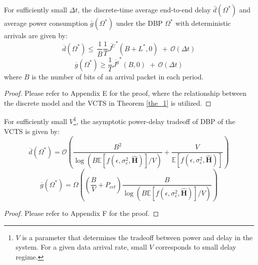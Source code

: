 \documentclass[11pt,journal, onecolumn]{./IEEEtran}
\newcommand{\blue}{\color{black}}
\newcommand{\red}{\color{black}}
\begin{document}
\begin{Theorem}\label{the_dpbound} {\red For sufficiently small $\Delta t$,} the discrete-time average end-to-end delay $\bar d(\Omega^*)$ and average power consumption $\bar g(\Omega^*)$ under the DBP $\Omega^*$ with deterministic arrivals are given by:
\begin{equation}\label{eq_dup}
\overline d \left( {{\Omega ^*}} \right) \le \,\frac{1}{{\overline B }}\frac{1}{T}{\overline {{J^U}} ^*}(B + {L^*},0)\,\, + \,\mathcal O\left( {\Delta t} \right)
\end{equation}
\begin{equation}\label{eq_plow}
\overline g \left( {{\Omega ^*}} \right) \ge \frac{1}{T}{\overline {{J^g}} ^*}(B ,0)\,\, + \,\mathcal O\left({\Delta t} \right)
\end{equation}
where $B$ is the number of bits of an arrival packet in each period. ~\hfill\IEEEQED
\end{Theorem}
\begin{proof}
Please refer to Appendix E for the proof, {\red where the relationship between the discrete model and the VCTS in Theorem \ref{the_1} is utilized.}
\end{proof}
\begin{Corollary}\label{cor_order} {\red For sufficiently small $V$}\footnote{\red $V$ is a parameter that determines the tradeoff between power and delay in the system. For a given data arrival rate, small $V$ corresponds to small delay regime.}, the asymptotic power-delay tradeoff of DBP  {\blue of the VCTS} is given by:
\begin{equation}\label{eq_dorde}
\overline d \left( {{\Omega ^*}} \right) =\mathcal O\left( {\frac{B^2}{{\log ({B }\mathbb{E}[f(\epsilon,\sigma_e^2,\mathbf{\hat{H}})]/V)}} + {\frac{V}{{\mathbb{E}[f(\epsilon,\sigma_e^2,\mathbf{\hat{H}})]}}}} \right)
\end{equation}
\begin{equation}\label{eq_gorde}
\overline g \left( {{\Omega ^*}} \right)= \Omega\left( {\left( {\frac{{{B }}}{V} + {P_{cct}}} \right)\frac{B}{{ \log ({B }\mathbb{E}[f(\epsilon,\sigma_e^2,\mathbf{\hat{H}})]/V)}}} \right)
\end{equation}
\end{Corollary}
\begin{proof}
Please refer to Appendix F for the proof.
\end{proof}
\end{document}
